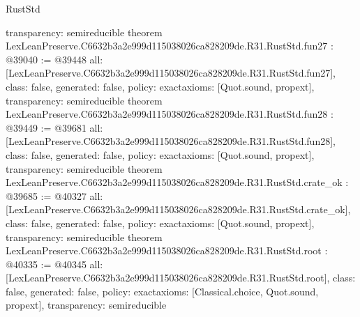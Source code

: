 \begin{lexlean}{RustStd}
\begin{coremodule}
{  transparency: semireducible
}
theorem LexLeanPreserve.C6632b3a2e999d115038026ca828209de.R31.RustStd.fun27 : @39040 := @39448 {
  all: [LexLeanPreserve.C6632b3a2e999d115038026ca828209de.R31.RustStd.fun27],
  class: false,
  generated: false,
  policy: exact{axioms: [Quot.sound, propext]},
  transparency: semireducible
}
theorem LexLeanPreserve.C6632b3a2e999d115038026ca828209de.R31.RustStd.fun28 : @39449 := @39681 {
  all: [LexLeanPreserve.C6632b3a2e999d115038026ca828209de.R31.RustStd.fun28],
  class: false,
  generated: false,
  policy: exact{axioms: [Quot.sound, propext]},
  transparency: semireducible
}
theorem LexLeanPreserve.C6632b3a2e999d115038026ca828209de.R31.RustStd.crate_ok : @39685 := @40327 {
  all: [LexLeanPreserve.C6632b3a2e999d115038026ca828209de.R31.RustStd.crate_ok],
  class: false,
  generated: false,
  policy: exact{axioms: [Quot.sound, propext]},
  transparency: semireducible
}
theorem LexLeanPreserve.C6632b3a2e999d115038026ca828209de.R31.RustStd.root : @40335 := @40345 {
  all: [LexLeanPreserve.C6632b3a2e999d115038026ca828209de.R31.RustStd.root],
  class: false,
  generated: false,
  policy: exact{axioms: [Classical.choice, Quot.sound, propext]},
  transparency: semireducible
}


\end{coremodule}
\end{lexlean}
